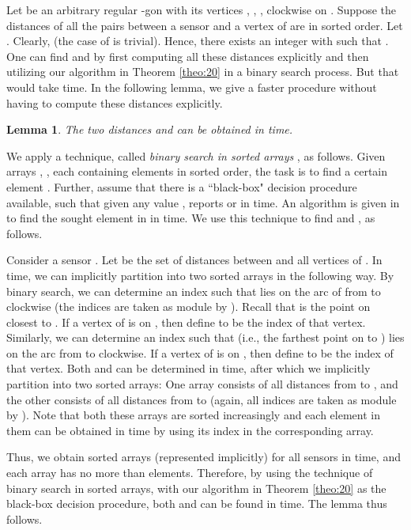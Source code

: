\documentclass[11pt]{article}
\newenvironment{proof}{\noindent {\textbf{Proof:}}\rm}{\hfill 
\rm}
\newtheorem{Lem}{Lemma}
\begin{document}
Let  be an arbitrary regular -gon with its vertices ,
, ,  clockwise on . Suppose the
distances of all the pairs between a sensor and a vertex of  are  in sorted order. Let .
Clearly,  (the case of  is
trivial). Hence, there exists an integer  with  such
that . One can find  and 
by first computing all these  distances explicitly and then utilizing
our algorithm in Theorem \ref{theo:20} in a binary search process.
But that would take 
time. In the following lemma, we give a faster procedure without
having to compute these  distances explicitly.

\begin{Lem}\label{lem:new20}
The two distances  and 
can be obtained in  time.
\end{Lem}
\begin{proof}
We apply a technique, called {\em binary search in sorted arrays}
\cite{ref:ChenRe11},
as follows. Given  arrays , , each containing
 elements in sorted order, the task is to find a certain element . Further, assume that there is a ``black-box"
decision procedure  available, such that given any value ,
 reports  or  in  time. An
algorithm is given in \cite{ref:ChenRe11} to find the sought element
 in  in 
time. We use this technique to find  and , as follows.

Consider a sensor . Let  be the set of distances
between  and all vertices of . In  time, we can
implicitly partition  into two sorted arrays in the
following way. By binary search, we can determine an index  such
that  lies on the arc of  from  to 
clockwise (the indices are taken as module by ). Recall that
 is the point on  closest to . If a vertex of
 is on , then define  to be the index of that vertex.
Similarly, we can determine an index  such that  (i.e., the
farthest point on  to ) lies on the arc from 
to  clockwise. If a vertex of  is on , then define
 to be the index of that vertex. Both  and  can be
determined in  time, after which we implicitly
partition  into two sorted arrays: One array consists of all
distances from  to , and the other
consists of all distances from  to
 (again, all indices are taken as
module by ). Note that both these arrays are sorted increasingly and
each element in them can be obtained in  time by using its index in
the corresponding array.

Thus, we obtain  sorted arrays (represented implicitly) for all  sensors in
 time, and each array has no more than  elements.
Therefore, by using the technique of binary search in sorted arrays, with
our algorithm in Theorem \ref{theo:20} as the black-box decision
procedure, both  and  can be found in 
time. The lemma thus follows.
\end{proof}
\end{document}

